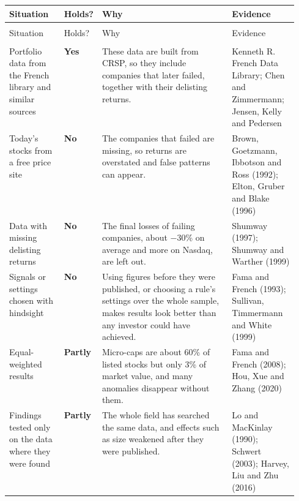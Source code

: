 \begingroup
\small
\setlength{\LTpre}{6pt}\setlength{\LTpost}{6pt}
\begin{longtable}{@{}>{\raggedright\arraybackslash}p{0.19\linewidth}>{\raggedright\arraybackslash}p{0.13\linewidth}>{\raggedright\arraybackslash}p{}>{\raggedright\arraybackslash}p{0.23\linewidth}@{}}
\toprule
Situation & Holds? & Why & Evidence \\
\midrule
\endfirsthead
\multicolumn{4}{@{}l}{\emph{(continued)}} \\
\toprule
Situation & Holds? & Why & Evidence \\
\midrule
\endhead
\midrule
\multicolumn{4}{r@{}}{\emph{(continued on the next page)}} \\
\endfoot
\bottomrule
\endlastfoot
Portfolio data from the French library and similar sources & \textbf{Yes} & These data are built from CRSP, so they include companies that later failed, together with their delisting returns. & Kenneth R. French Data Library; Chen and Zimmermann; Jensen, Kelly and Pedersen \\*
\addlinespace[3pt]
Today's stocks from a free price site & \textbf{No} & The companies that failed are missing, so returns are overstated and false patterns can appear. & Brown, Goetzmann, Ibbotson and Ross (1992); Elton, Gruber and Blake (1996) \\
\addlinespace[3pt]
Data with missing delisting returns & \textbf{No} & The final losses of failing companies, about $-30$\% on average and more on Nasdaq, are left out. & Shumway (1997); Shumway and Warther (1999) \\
\addlinespace[3pt]
Signals or settings chosen with hindsight & \textbf{No} & Using figures before they were published, or choosing a rule's settings over the whole sample, makes results look better than any investor could have achieved. & Fama and French (1993); Sullivan, Timmermann and White (1999) \\
\addlinespace[3pt]
Equal-weighted results & \textbf{Partly} & Micro-caps are about 60\% of listed stocks but only 3\% of market value, and many anomalies disappear without them. & Fama and French (2008); Hou, Xue and Zhang (2020) \\*
\addlinespace[3pt]
Findings tested only on the data where they were found & \textbf{Partly} & The whole field has searched the same data, and effects such as size weakened after they were published. & Lo and MacKinlay (1990); Schwert (2003); Harvey, Liu and Zhu (2016) \\
\end{longtable}
\addtocounter{table}{-1}%
\endgroup

